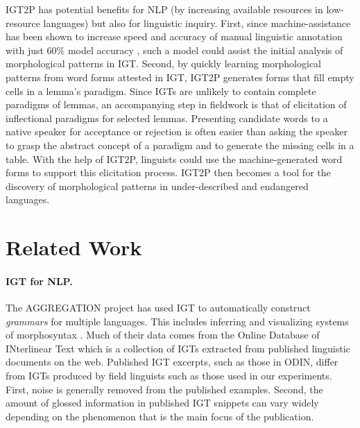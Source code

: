IGT2P has potential benefits for NLP (by increasing available resources in low-resource languages) but also for linguistic inquiry. First, since machine-assistance has been shown to increase speed and accuracy of manual linguistic annotation with just 60\% model accuracy \citep{felt_improving_2012}, such a model could assist the initial analysis of morphological patterns in IGT. Second, by quickly learning morphological patterns from word forms attested in IGT, IGT2P generates forms that fill empty cells in a lemma's paradigm. Since IGTs are unlikely to contain complete paradigms of lemmas, an accompanying step in fieldwork is that of elicitation of inflectional paradigms for selected lemmas. Presenting candidate words to a native speaker for acceptance or rejection is often easier than asking the speaker to grasp the abstract concept of a paradigm and to generate the missing cells in a table. With the help of IGT2P, linguists could use the machine-generated word forms to support this elicitation process. IGT2P then becomes a tool for the discovery of morphological patterns in under-described and endangered languages.

\section{Related Work}

\paragraph{IGT for NLP.} The AGGREGATION project \citep{bender_language_2014} has used IGT to automatically construct \textit{grammars} for multiple languages. This includes inferring and visualizing systems of morphosyntax \citep{lepp_visualizing_2019,wax_automated_2014}. Much of their data comes from the Online Database of INterlinear Text \citep[ODIN]{lewis_developing_2010} which is a collection of IGTs extracted from published linguistic documents on the web. Published IGT excerpts, such as those in ODIN, differ from IGTs produced by field linguists such as those used in our experiments. First, noise is generally removed from the published examples. 
Second, the amount of glossed information in published IGT snippets can vary widely depending on the phenomenon that is the main focus of the publication.

